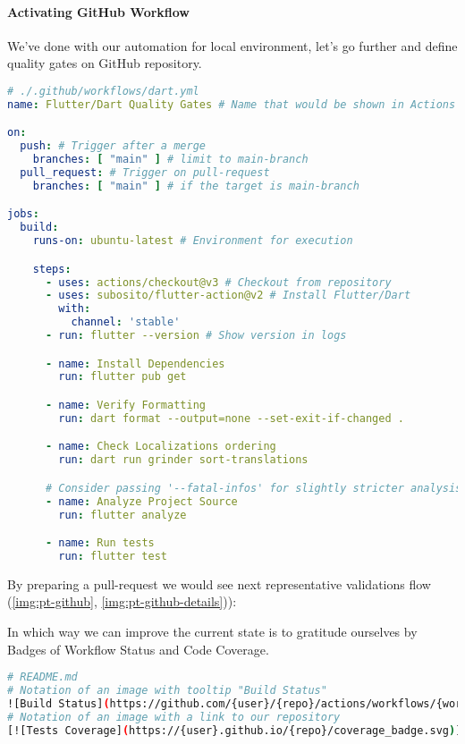 \paragraph{Activating GitHub Workflow}

We've done with our automation for local environment, let's go further and define quality gates on GitHub repository.

\begin{lstlisting}[language=yaml]
# ./.github/workflows/dart.yml
name: Flutter/Dart Quality Gates # Name that would be shown in Actions tab

on:
  push: # Trigger after a merge
    branches: [ "main" ] # limit to main-branch
  pull_request: # Trigger on pull-request
    branches: [ "main" ] # if the target is main-branch

jobs:
  build:
    runs-on: ubuntu-latest # Environment for execution

    steps:
      - uses: actions/checkout@v3 # Checkout from repository
      - uses: subosito/flutter-action@v2 # Install Flutter/Dart
        with:
          channel: 'stable'
      - run: flutter --version # Show version in logs

      - name: Install Dependencies
        run: flutter pub get

      - name: Verify Formatting
        run: dart format --output=none --set-exit-if-changed .

      - name: Check Localizations ordering
        run: dart run grinder sort-translations

      # Consider passing '--fatal-infos' for slightly stricter analysis.
      - name: Analyze Project Source
        run: flutter analyze

      - name: Run tests
        run: flutter test
\end{lstlisting}

\noindent By preparing a pull-request we would see next representative validations flow 
(\cref{img:pt-github}, \cref{img:pt-github-details})):



In which way we can improve the current state is to gratitude ourselves by Badges of Workflow Status and Code Coverage.

\begin{lstlisting}[language=bash]
# README.md
# Notation of an image with tooltip "Build Status" 
![Build Status](https://github.com/{user}/{repo}/actions/workflows/{workflow-name}.yml/badge.svg?branch=main)
# Notation of an image with a link to our repository
[![Tests Coverage](https://{user}.github.io/{repo}/coverage_badge.svg)](https://github.com/{user}/{repo})
\end{lstlisting}

